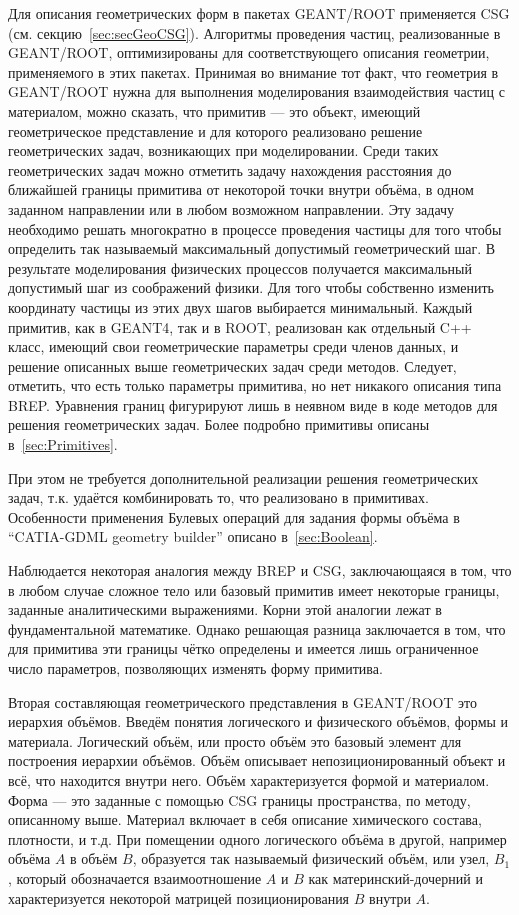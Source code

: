 Для описания геометрических форм в пакетах GEANT/ROOT применяется CSG (см. секцию~\ref{sec:secGeoCSG}).
Алгоритмы проведения частиц, реализованные в GEANT/ROOT, оптимизированы для соответствующего описания геометрии, применяемого в этих пакетах.
Принимая во внимание тот факт, что геометрия в GEANT/ROOT нужна для выполнения моделирования взаимодействия частиц с материалом, можно сказать, что примитив --- это объект, имеющий геометрическое представление и для которого реализовано решение геометрических задач, возникающих при моделировании. Среди таких геометрических задач можно отметить задачу нахождения расстояния до ближайшей границы примитива от некоторой точки внутри объёма, в одном заданном направлении или в любом возможном направлении. Эту задачу необходимо решать многократно в процессе проведения частицы для того чтобы определить так называемый максимальный допустимый геометрический шаг. В результате моделирования физических процессов получается максимальный допустимый шаг из соображений физики. Для того чтобы собственно изменить координату частицы из этих двух шагов выбирается минимальный. Каждый примитив, как в GEANT4, так и в ROOT, реализован как отдельный C++ класс, имеющий свои геометрические параметры среди членов данных, и решение описанных выше геометрических задач среди методов. Следует, отметить, что есть только параметры примитива, но нет никакого описания типа BREP. Уравнения границ фигурируют лишь в неявном виде в коде методов для решения геометрических задач. Более подробно примитивы описаны в~\ref{sec:Primitives}.

При этом не требуется дополнительной реализации решения геометрических задач, т.к. удаётся комбинировать то, что реализовано в примитивах.
Особенности применения Булевых операций для задания формы объёма в ``CATIA-GDML geometry builder'' описано в~\ref{sec:Boolean}.

Наблюдается некоторая аналогия между BREP и CSG, заключающаяся в том, что в любом случае сложное тело или базовый примитив имеет некоторые границы, заданные аналитическими выражениями. Корни этой аналогии лежат в фундаментальной математике. Однако решающая разница заключается в том, что для примитива эти границы чётко определены и имеется лишь ограниченное число параметров, позволяющих изменять форму примитива.

Вторая составляющая геометрического представления в GEANT/ROOT это иерархия объёмов. Введём понятия логического и физического объёмов, формы и материала. Логический объём, или просто объём это базовый элемент для построения иерархии объёмов. Объём описывает непозиционированный объект и всё, что находится внутри него. Объём характеризуется формой и материалом. Форма --- это заданные с помощью CSG границы пространства, по методу, описанному выше. Материал включает в себя описание химического состава, плотности, и т.д. При помещении одного логического объёма в другой, например объёма $A$ в объём $B$, образуется так называемый физический объём, или узел, $B_1$, который обозначается взаимоотношение $A$ и $B$ как материнский-дочерний и характеризуется некоторой матрицей позиционирования $B$ внутри $A$.

